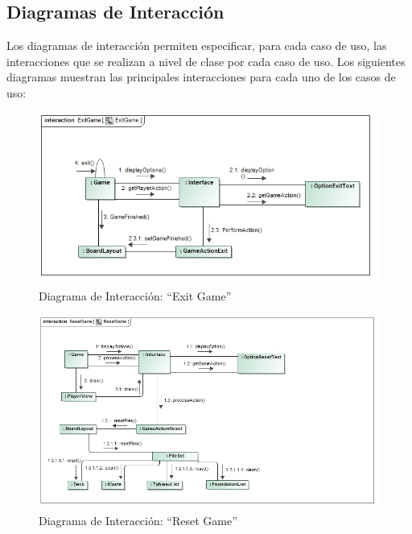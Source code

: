 \documentclass[11pt]{article}
\begin{document}
\subsection{Diagramas de Interacción} 

Los diagramas de interacción permiten especificar, para cada caso de uso, las interacciones que se realizan a nivel de clase por cada caso de uso. Los siguientes diagramas muestran las principales interacciones para cada uno de los casos de uso:

\begin{center}
 \begin{figure}[H]
 \begin{center}
   \includegraphics[width=16cm]{Analysis/ExitGameSequence00.jpg}
   \caption{Diagrama de Interacción: ``Exit Game''}
   \label{fig:exitgamesequence}
 \end{center}
 \end{figure}
\end{center}

\begin{center}
 \begin{figure}[H]
 \begin{center}
   \includegraphics[width=16cm]{Analysis/ResetGameSequence00.jpg}
   \caption{Diagrama de Interacción: ``Reset Game''}
   \label{fig:exitgamesequence}
 \end{center}
 \end{figure}
\end{center}
\end{document}
